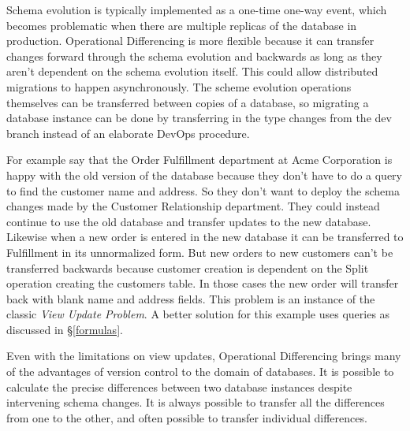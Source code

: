\documentclass[english,submission]{programming}
\theoremstyle{definition}
\newtheorem*{note}{Note}
\newcommand{\mathbox}[1]{\colorbox{black!10}{$#1$\phantom{i\hspace{-3.5pt}}}}
\begin{document}
Schema evolution is typically implemented as a one-time one-way event, which becomes problematic when there are multiple replicas of the database in production. Operational Differencing is more flexible because it can transfer changes forward through the schema evolution and backwards as long as they aren't dependent on the schema evolution itself. This could allow distributed migrations to happen asynchronously.
The scheme evolution operations themselves can be transferred between copies of a database, so migrating a database instance can be done by transferring in the type changes from the dev branch instead of an elaborate DevOps procedure.

For example say that the Order Fulfillment department at Acme Corporation is happy with the old version of the database because they don't have to do a query to find the customer name and address. So they don't want to deploy the schema changes made by the Customer Relationship department. They could instead continue to use the old database and transfer updates to the new database. Likewise when a new order is entered in the new database it can be transferred to Fulfillment in its unnormalized form. But new orders to new customers can't be transferred backwards because customer creation is dependent on the \textsf{Split} operation creating the customers table. In those cases the new order will transfer back with blank name and address fields. This problem is an instance of the classic \textit{View Update Problem}\cite{Bancilhon81, Foster2007}. A better solution for this example uses queries as discussed in \S\ref{formulas}.

Even with the limitations on view updates, Operational Differencing brings many of the advantages of version control to the domain of databases. It is possible to calculate the precise differences between two database instances despite intervening schema changes. It is always possible to transfer all the differences from one to the other, and often possible to transfer individual differences.

\end{document}
